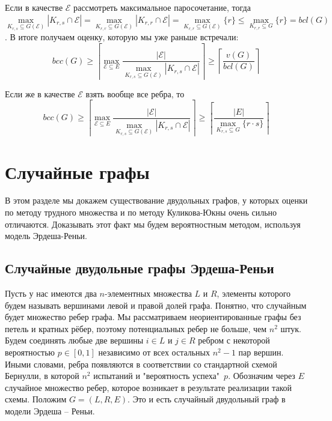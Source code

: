 \documentclass[a4paper]{article}
\begin{document}
Если в качестве $\mathcal{E}$ рассмотреть максимальное паросочетание, тогда $\max\limits_{K_{r,s}\subseteq 
G(\mathcal{E})}|K_{r,s}\cap\mathcal{E}| = \max\limits_{K_{r,r}\subseteq G(\mathcal{E})}|K_{r,r}\cap\mathcal{E}| = 
\max\limits_{K_{r,r}\subseteq G(\mathcal{E})}\{r\} \leq \max\limits_{K_{r,r}\subseteq G}\{r\} = bcl(G)$. В итоге 
получаем оценку, которую мы уже раньше встречали: $$bcc(G) \geq \left\lceil\max\limits_{\mathcal{E}\subseteq E}\frac{|\mathcal{E}|}
{\max\limits_{K_{r,s}\subseteq G(\mathcal{E})}|K_{r,s}\cap\mathcal{E}|}\right\rceil  \geq \left\lceil\frac{v(G)}{bcl(G)}\right\rceil$$

Если же в качестве $\mathcal{E}$ взять вообще все ребра, то $$bcc(G) \geq \left\lceil\max\limits_{\mathcal{E}\subseteq E}\frac{|\mathcal{E}|}
{\max\limits_{K_{r,s}\subseteq G(\mathcal{E})}|K_{r,s}\cap\mathcal{E}|}\right\rceil \geq \left\lceil\frac{|E|}
{\max\limits_{K_{r,s}\subseteq G}\{r\cdot s\}}\right\rceil$$

\setcounter{mclaim}{0}
\setcounter{mlemma}{0}
\setcounter{mtheorem}{0}
\addtocounter{section}{1}
\section*{Случайные графы}
В этом разделе мы докажем существование двудольных графов, у которых оценки по методу трудного множества и 
по методу Куликова-Юкны очень сильно отличаются. Доказывать этот факт мы будем вероятностным методом, 
используя модель Эрдеша-Реньи.

\setcounter{subsection}{0}
\subsection{Случайные двудольные графы Эрдеша-Реньи}

Пусть у нас имеются два $n$-элементных множества $L$ и $R$, элементы которого будем называть вершинами 
левой и правой долей графа. Понятно, что случайным будет множество ребер графа. Мы рассматриваем 
неориентированные графы без петель и кратных рёбер, поэтому потенциальных ребер не больше, чем $n^2$ штук. 
Будем соединять любые две вершины $i \in L$ и $j \in R$ ребром с некоторой вероятностью $p\in [0, 1]$ 
независимо от всех остальных $n^2 - 1$ пар вершин. Иными словами, ребра появляются в соответствии со 
стандартной схемой Бернулли, в которой $n^2$ испытаний и "вероятность успеха"\ $p$. Обозначим через $E$
случайное множество ребер, которое возникает в результате реализации такой схемы. Положим $G = (L, R, E)$. 
Это и есть случайный двудольный граф в модели Эрдеша – Реньи. 
\end{document}
